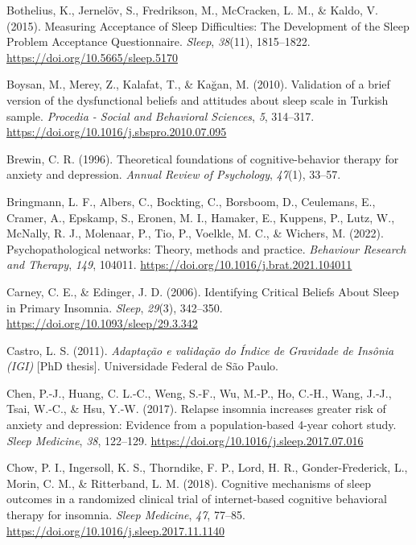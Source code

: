 \documentclass[
  ,doc,11pt, twoside,floatsintext]{apa6}
\newlength{\cslhangindent}
\newlength{\cslentryspacingunit} %
\newenvironment{CSLReferences}[2] %
 {%
  \setlength{\parindent}{0pt}
  \ifodd #1
  \let\oldpar\par
  \def\par{\hangindent=\cslhangindent\oldpar}
  \fi
  \setlength{\parskip}{#2\cslentryspacingunit}
 }%
 {}
\begin{document}
\begin{CSLReferences}{1}{0}
\leavevmode{}%
Bothelius, K., Jernelöv, S., Fredrikson, M., McCracken, L. M., \& Kaldo, V. (2015). Measuring {Acceptance} of {Sleep Difficulties}: {The Development} of the {Sleep Problem Acceptance Questionnaire}. \emph{Sleep}, \emph{38}(11), 1815--1822. \url{https://doi.org/10.5665/sleep.5170}

\leavevmode{}%
Boysan, M., Merey, Z., Kalafat, T., \& Kağan, M. (2010). Validation of a brief version of the dysfunctional beliefs and attitudes about sleep scale in {Turkish} sample. \emph{Procedia - Social and Behavioral Sciences}, \emph{5}, 314--317. \url{https://doi.org/10.1016/j.sbspro.2010.07.095}

\leavevmode{}%
Brewin, C. R. (1996). Theoretical foundations of cognitive-behavior therapy for anxiety and depression. \emph{Annual Review of Psychology}, \emph{47}(1), 33--57.

\leavevmode{}%
Bringmann, L. F., Albers, C., Bockting, C., Borsboom, D., Ceulemans, E., Cramer, A., Epskamp, S., Eronen, M. I., Hamaker, E., Kuppens, P., Lutz, W., McNally, R. J., Molenaar, P., Tio, P., Voelkle, M. C., \& Wichers, M. (2022). Psychopathological networks: {Theory}, methods and practice. \emph{Behaviour Research and Therapy}, \emph{149}, 104011. \url{https://doi.org/10.1016/j.brat.2021.104011}

\leavevmode{}%
Carney, C. E., \& Edinger, J. D. (2006). Identifying {Critical Beliefs About Sleep} in {Primary Insomnia}. \emph{Sleep}, \emph{29}(3), 342--350. \url{https://doi.org/10.1093/sleep/29.3.342}

\leavevmode{}%
Castro, L. S. (2011). \emph{Adaptação e validação do {Índice} de {Gravidade} de {Insônia} ({IGI})} {[}PhD thesis{]}. Universidade Federal de São Paulo.

\leavevmode{}%
Chen, P.-J., Huang, C. L.-C., Weng, S.-F., Wu, M.-P., Ho, C.-H., Wang, J.-J., Tsai, W.-C., \& Hsu, Y.-W. (2017). Relapse insomnia increases greater risk of anxiety and depression: Evidence from a population-based 4-year cohort study. \emph{Sleep Medicine}, \emph{38}, 122--129. \url{https://doi.org/10.1016/j.sleep.2017.07.016}

\leavevmode{}%
Chow, P. I., Ingersoll, K. S., Thorndike, F. P., Lord, H. R., Gonder-Frederick, L., Morin, C. M., \& Ritterband, L. M. (2018). Cognitive mechanisms of sleep outcomes in a randomized clinical trial of internet-based cognitive behavioral therapy for insomnia. \emph{Sleep Medicine}, \emph{47}, 77--85. \url{https://doi.org/10.1016/j.sleep.2017.11.1140}


\end{CSLReferences}
\end{document}

